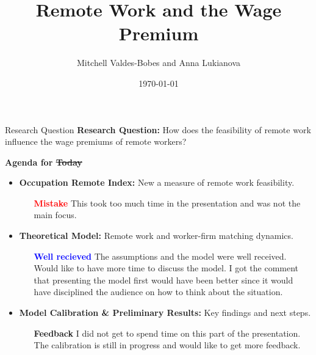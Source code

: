 \documentclass[aspectratio=1610]{beamer}
\title{Remote Work and the Wage Premium}
\author{Mitchell Valdes-Bobes and Anna Lukianova}
\date{\today}
\begin{document}
{
  \begin{frame}
    \titlepage
  \end{frame}
}
\addtocounter{framenumber}{-1}

\begin{frame}{Research Question}
\textbf{Research Question:} How does the feasibility of remote work influence the wage premiums of remote workers?
\vspace{1cm}

\textbf{Agenda for \sout{Today}}
\begin{itemize}  
    \item \textbf{Occupation Remote Index:} New a measure of remote work feasibility.
    \begin{itemize}
        \item[\textbf{\textcolor{red}{Mistake}}] This took too much time in the presentation and was not the main focus. 
    \end{itemize}
    \item \textbf{Theoretical Model:} Remote work and worker-firm matching dynamics.
    \begin{itemize}
        \item[\textbf{\textcolor{blue}{Well recieved}}] The assumptions and the model were well received. Would like to have more time to discuss the model. I got the comment that presenting the model first would have been better since it would have disciplined the audience on how to think about the situation.
    \end{itemize}
    \item \textbf{Model Calibration \& Preliminary Results:} Key findings and next steps. 
    \begin{itemize}
        \item[\textbf{Feedback}] I did not get to spend time on this part of the presentation. The calibration is still in progress and would like to get more feedback.
    \end{itemize}
    
\end{itemize}  

\end{frame}  
\end{document}
